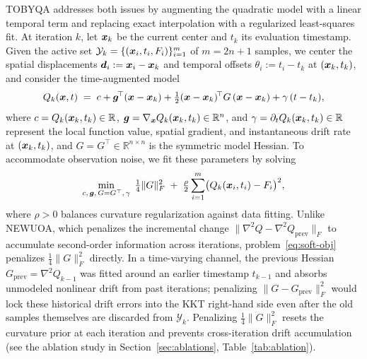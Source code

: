 TOBYQA addresses both issues by augmenting the quadratic model with a linear temporal term and replacing exact interpolation with a regularized least-squares fit. At iteration $k$, let $\boldsymbol{x}_k$ be the current center and $t_k$ its evaluation timestamp. Given the active set $\mathcal{Y}_k = \{(\boldsymbol{x}_i, t_i, F_i)\}_{i=1}^m$ of $m = 2n+1$ samples, we center the spatial displacements $\boldsymbol{d}_i := \boldsymbol{x}_i - \boldsymbol{x}_k$ and temporal offsets $\theta_i := t_i - t_k$ at $(\boldsymbol{x}_k, t_k)$, and consider the time-augmented model
\begin{equation*}
  Q_k(\boldsymbol{x},t) \;=\; c + \boldsymbol{g}^{\!\top}(\boldsymbol{x} - \boldsymbol{x}_k) + \tfrac{1}{2}(\boldsymbol{x} - \boldsymbol{x}_k)^{\!\top}G\,(\boldsymbol{x} - \boldsymbol{x}_k) + \gamma\,(t - t_k),
\end{equation*}
where $c = Q_k(\boldsymbol{x}_k, t_k) \in \mathbb{R}$, $\boldsymbol{g} = \nabla_{\boldsymbol{x}} Q_k(\boldsymbol{x}_k, t_k) \in \mathbb{R}^n$, and $\gamma = \partial_t Q_k(\boldsymbol{x}_k, t_k) \in \mathbb{R}$ represent the local function value, spatial gradient, and instantaneous drift rate at $(\boldsymbol{x}_k, t_k)$, and $G = G^\top \in \mathbb{R}^{n\times n}$ is the symmetric model Hessian. To accommodate observation noise, we fit these parameters by solving
\begin{equation}\label{eq:soft-obj}
  \min_{c,\,\boldsymbol{g},\,G=G^\top,\,\gamma}\;
  \tfrac{1}{4}\|G\|_F^2
  \;+\;
  \tfrac{\rho}{2}\sum_{i=1}^{m}
  \bigl(Q_k(\boldsymbol{x}_i, t_i) - F_i\bigr)^2,
\end{equation}
where $\rho>0$ balances curvature regularization against data fitting. Unlike NEWUOA, which penalizes the incremental change $\|\nabla^2 Q - \nabla^2 Q_{\mathrm{prev}}\|_F$ to accumulate second-order information across iterations, problem~\eqref{eq:soft-obj} penalizes $\tfrac{1}{4}\|G\|_F^2$ directly. In a time-varying channel, the previous Hessian $G_{\mathrm{prev}} = \nabla^2 Q_{k-1}$ was fitted around an earlier timestamp $t_{k-1}$ and absorbs unmodeled nonlinear drift from past iterations; penalizing $\|G - G_{\mathrm{prev}}\|_F^2$ would lock these historical drift errors into the KKT right-hand side even after the old samples themselves are discarded from $\mathcal{Y}_k$. Penalizing $\tfrac{1}{4}\|G\|_F^2$ resets the curvature prior at each iteration and prevents cross-iteration drift accumulation (see the ablation study in Section~\ref{sec:ablations}, Table~\ref{tab:ablation}).


